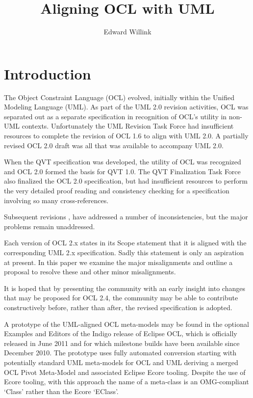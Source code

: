 \documentclass{eceasst}
\title{%
Aligning OCL with UML}
\author{%
Edward Willink\autref{1}}
\institute{%
\autlabel{1} \email{ed \_at\_ willink.me.uk}, \url{http://www.eclipse.org/modeling}\\
Eclipse Modeling Project}
\begin{document}
\maketitle
\section{Introduction}

The Object Constraint Language (OCL) evolved, initially within the Unified Modeling Language (UML). As part of the UML 2.0\cite{UML-2.0} revision activities, OCL was separated out as a separate specification in recognition of OCL's utility in non-UML contexts. Unfortunately the UML Revision Task Force had insufficient resources to complete the revision of OCL 1.6\cite{OCL-1.6} to align with UML 2.0. A partially revised OCL 2.0 draft\cite{OCL-2.0-draft} was all that was available to accompany UML 2.0.

When the QVT specification was developed, the utility of OCL was recognized and OCL 2.0\cite{OCL-2.0} formed the basis for QVT 1.0\cite{QVT-1.0}. The QVT Finalization Task Force also finalized the OCL 2.0 specification, but  had insufficient resources to perform the very detailed proof reading and consistency checking for a specification involving so many cross-references.

Subsequent revisions \cite{OCL-2.2},\cite{OCL-2.3} have addressed a number of  inconsistencies, but the major problems remain unaddressed.

Each version of OCL 2.x states in its Scope statement that it is aligned with the corresponding UML 2.x specification. Sadly this statement is only an aspiration at present. In this paper we examine the major misalignments and outline a proposal to resolve these and other minor misalignments.

It is hoped that by presenting the community with an early insight into changes that may be proposed for OCL 2.4, the community may be able to contribute constructively before, rather than after, the revised specification is adopted.

A prototype of the UML-aligned OCL meta-models may be found in the optional Examples and Editors of the Indigo release of Eclipse OCL, which is officially released in June 2011 and for which milestone builds have been available since December 2010. The prototype uses fully automated conversion starting with potentially standard UML meta-models for OCL and UML deriving a merged OCL Pivot Meta-Model and associated Eclipse Ecore tooling. Despite the use of Ecore tooling, with this approach the name of a meta-class is an OMG-compliant `Class' rather than the Ecore `EClass'. 
\end{document}

